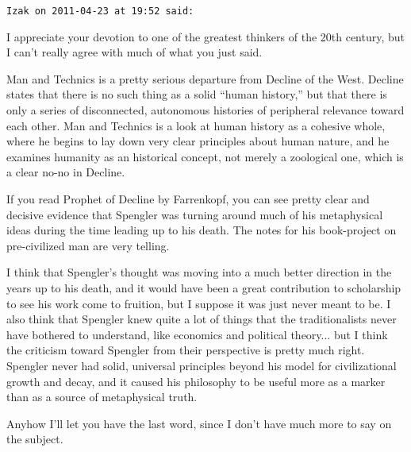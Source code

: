 \begin{footnotesize}
\begin{sffamily}
\hfill

\texttt{Izak on 2011-04-23 at 19:52 said:}

I appreciate your devotion to one of the greatest thinkers of the 20th century, but I can't really agree with much of what you just said.

Man and Technics is a pretty serious departure from Decline of the West. Decline states that there is no such thing as a solid ``human history,'' but that there is only a series of disconnected, autonomous histories of peripheral relevance toward each other. Man and Technics is a look at human history as a cohesive whole, where he begins to lay down very clear principles about human nature, and he examines humanity as an historical concept, not merely a zoological one, which is a clear no-no in Decline.

If you read Prophet of Decline by Farrenkopf, you can see pretty clear and decisive evidence that Spengler was turning around much of his metaphysical ideas during the time leading up to his death. The notes for his book-project on pre-civilized man are very telling.

I think that Spengler's thought was moving into a much better direction in the years up to his death, and it would have been a great contribution to scholarship to see his work come to fruition, but I suppose it was just never meant to be. I also think that Spengler knew quite a lot of things that the traditionalists never have bothered to understand, like economics and political theory... but I think the criticism toward Spengler from their perspective is pretty much right. Spengler never had solid, universal principles beyond his model for civilizational growth and decay, and it caused his philosophy to be useful more as a marker than as a source of metaphysical truth.

Anyhow I'll let you have the last word, since I don't have much more to say on the subject.

\end{sffamily}
\end{footnotesize}

